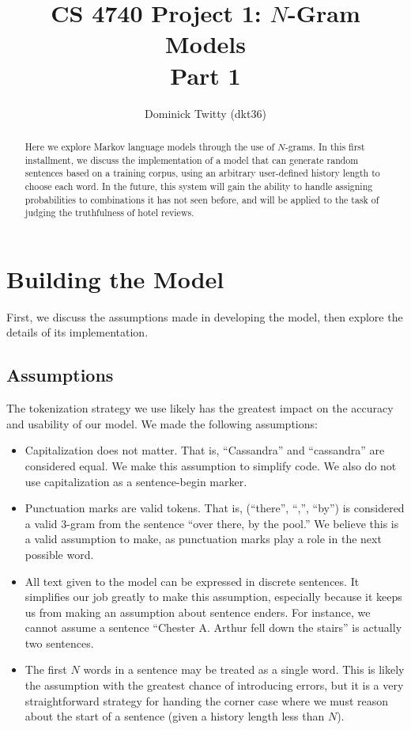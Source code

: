\documentclass[12pt]{article}
\begin{document}
\title{CS 4740 Project 1: $N$-Gram Models\\
Part 1}
\author{Dominick Twitty (dkt36)}
\maketitle

\begin{abstract}
Here we explore Markov language models through the use of $N$-grams. In this first installment, we discuss the implementation of a model that can generate random sentences based on a training corpus, using an arbitrary user-defined history length to choose each word. In the future, this system will gain the ability to handle assigning probabilities to combinations it has not seen before, and will be applied to the task of judging the truthfulness of hotel reviews.
\end{abstract}

\section{Building the Model}
First, we discuss the assumptions made in developing the model, then explore the details of its implementation.
\subsection{Assumptions}
The tokenization strategy we use likely has the greatest impact on the accuracy and usability of our model. We  made the following assumptions:
\begin{itemize}
\item Capitalization does not matter. That is, ``Cassandra'' and ``cassandra'' are considered equal. We make this assumption to simplify code. We also do not use capitalization as a sentence-begin marker.
\item Punctuation marks are valid tokens. That is, (``there'', ``,'', ``by'') is considered a valid 3-gram from the sentence ``over there, by the pool.'' We believe this is a valid assumption to make, as punctuation marks play a role in the next possible word. 
\item All text given to the model can be expressed in discrete sentences. It simplifies our job greatly to make this assumption, especially because it keeps us from making an assumption about sentence enders. For instance, we cannot assume a sentence ``Chester A. Arthur fell down the stairs'' is actually two sentences.
\item The first $N$ words in a sentence may be treated as a single word. This is likely the assumption with the greatest chance of introducing errors, but it is a very straightforward strategy for handing the corner case where we must reason about the start of a sentence (given a history length less than $N$). 
\end{itemize}
\end{document}
